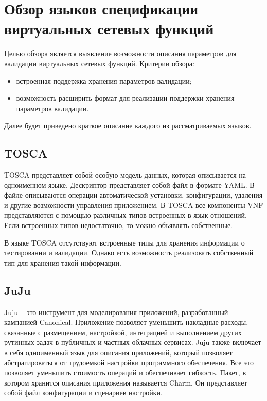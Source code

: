 \documentclass[oneside,final,14pt,a4paper]{extreport}
\begin{document}
\section{Обзор языков спецификации виртуальных сетевых функций}
\label{sec:review-vnf-languages}
Целью обзора является выявление возможности описания параметров для валидации виртуальных сетевых функций. Критерии обзора: 
\begin{itemize}
    \item встроенная поддержка хранения параметров валидации;
    \item возможность расширить формат для реализации поддержки хранения параметров валидации.
\end{itemize}

Далее будет приведено краткое описание каждого из рассматриваемых языков. 

\subsection{TOSCA}
TOSCA\cite{bib:tosca} представляет собой особую модель данных, которая описывается на одноименном языке. Дескриптор представляет собой файл в формате YAML\cite{bib:yaml}. В файле описываются операции автоматической установки, конфигурации, удаления и другие возможности управления приложением. В TOSCA все компоненты VNF представляются с помощью различных типов встроенных в язык отношений. Если встроенных типов недостаточно, то можно объявлять собственные.

В языке TOSCA отсутствуют встроенные типы для хранения информации о тестировании и валидации. Однако есть возможность реализовать собственный тип для хранения такой информации.

\subsection{JuJu}
Juju\cite{bib:juju:state} -- это инструмент для моделирования приложений, разработанный кампанией Canonical. Приложение позволяет уменьшить накладные расходы, связанные с размещением, настройкой, интеграцией и выполнением других рутинных задач в публичных и частных облачных сервисах. Juju также включает в себя одноименный язык для описания приложений, который позволяет абстрагироваться от трудоемкой настройки программного обеспечения. Все это позволяет уменьшить стоимость операций и обеспечивает гибкость. Пакет, в котором хранится описания приложения называется Charm. Он представляет собой файл конфигурации и сценариев настройки.
\end{document}
